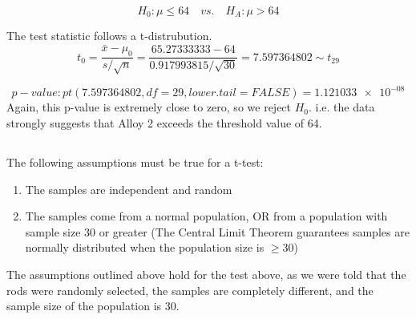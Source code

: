 \documentclass[letterpaper]{article}
\begin{document}
$$H_0: \mu \leq 64 \quad vs. \quad H_A: \mu > 64 $$

The test statistic follows a t-distrubution.
$$t_0 = \frac{\bar{x}-\mu_0}{s/\sqrt{n}} = \frac{65.27333333 - 64}{0.917993815/\sqrt{30}} =  7.597364802 \sim t_{29}$$

$$ {p-value}: pt(7.597364802, df=29, lower.tail=FALSE) = \SI{1.121033e-08} $$
Again, this p-value is extremely close to zero, so we reject $H_0$.
i.e. the data strongly suggests that Alloy 2 exceeds the threshold value of 64.

\subsection{}%
%
The following assumptions must be true for a t-test:
\begin{enumerate}
 \item The samples are independent and random
 \item The samples come from a normal population,
       OR from a population with sample size 30 or greater
       (The Central Limit Theorem guarantees samples are normally distributed
       when the population size is $\geq 30$)
\end{enumerate}

The assumptions outlined above hold for the test above, as we were told that the
rods were randomly selected, the samples are completely different, and the
sample size of the population is 30.

\section{}%

\subsection{}%
\end{document}
